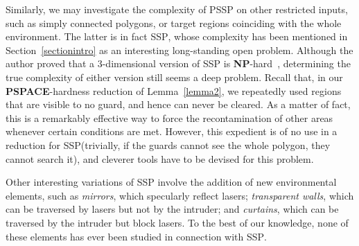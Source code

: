 \documentclass{style}
\newcommand{\complexityclass}[1]{\textbf{#1}}
\newcommand{\computproblem}[1]{\textsc{#1}}
\newcommand{\NP}{\complexityclass{NP}\xspace}
\newcommand{\PSPACE}{\complexityclass{PSPACE}\xspace}
\newcommand{\SSP}{\computproblem{SSP}\xspace}
\newcommand{\PSSP}{\computproblem{PSSP}\xspace}
\begin{document}
Similarly, we may investigate the complexity of \PSSP on other restricted inputs, such as simply connected polygons, or target regions coinciding with the whole environment. The latter is in fact \SSP, whose complexity has been mentioned in Section~\ref{sectionintro} as an interesting long-standing open problem. Although the author proved that a 3-dimensional version of \SSP is \NP-hard~\cite{viglietta2}, determining the true complexity of either version still seems a deep problem. Recall that, in our \PSPACE-hardness reduction of Lemma~\ref{lemma2}, we repeatedly used regions that are visible to no guard, and hence can never be cleared. As a matter of fact, this is a remarkably effective way to force the recontamination of other areas whenever certain conditions are met. However, this expedient is of no use in a reduction for \SSP (trivially, if the guards cannot see the whole polygon, they cannot search it), and cleverer tools have to be devised for this problem.

Other interesting variations of \SSP involve the addition of new environmental elements, such as \emph{mirrors}, which specularly reflect lasers; \emph{transparent walls}, which can be traversed by lasers but not by the intruder; and \emph{curtains}, which can be traversed by the intruder but block lasers. To the best of our knowledge, none of these elements has ever been studied in connection with \SSP.

\small

\end{document}
